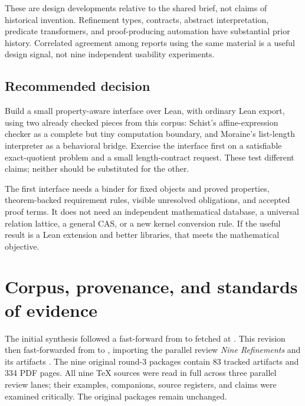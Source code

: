 \documentclass[11pt,letterpaper]{article}
\newcommand{\code}[1]{\texttt{\detokenize{#1}}}
\theoremstyle{definition}\newtheorem{definition}[proposition]{Definition}
\theoremstyle{remark}\newtheorem{remark}[proposition]{Remark}
\begin{document}
These are design developments relative to the shared brief, not claims of
historical invention. Refinement types, contracts, abstract interpretation,
predicate transformers, and proof-producing automation have substantial prior
history. Correlated agreement among reports using the same material is a useful
design signal, not nine independent usability experiments.

\subsection{Recommended decision}
Build a small property-aware interface over Lean, with ordinary Lean export,
using two already checked pieces from this corpus: Schist's affine-expression
checker as a complete but tiny computation boundary, and Moraine's list-length
interpreter as a behavioral bridge. Exercise the interface first on a
satisfiable exact-quotient problem and a small length-contract request. These
test different claims; neither should be substituted for the other.

The first interface needs a binder for fixed objects and proved properties,
theorem-backed requirement rules, visible unresolved obligations, and accepted
proof terms. It does not need an independent mathematical database, a universal
relation lattice, a general CAS, or a new kernel conversion rule. If the useful
result is a Lean extension and better libraries, that meets the mathematical
objective.

\section{Corpus, provenance, and standards of evidence}\label{sec:corpus}

The initial synthesis followed a fast-forward from \code{a18e3eb} to fetched
\code{main} at \code{58bb542}. This revision then fast-forwarded from
\code{856b619} to \code{8ddc6ab}, importing the parallel review
\emph{Nine Refinements} and its artifacts \cite{round3-peer}.
The nine original round-3 packages contain 83 tracked artifacts and
334 PDF pages. All nine TeX sources were read in full across three parallel
review lanes; their examples, companions, source registers, and claims were
examined critically. The original packages remain unchanged.
\end{document}
